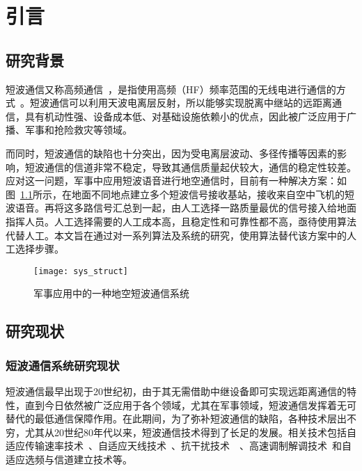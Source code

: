
\chapter{引言}
\label{chapter:introduction}

\section{研究背景}

短波通信又称高频通信~\cite{胡中豫2003现代短波通信}，是指使用高频（HF）频率范围的无线电进行通信的方式~\cite{董彬虹2007短波通信的现状及发展趋势}。短波通信可以利用天波电离层反射，所以能够实现脱离中继站的远距离通信，具有机动性强、设备成本低、对基础设施依赖小的优点，因此被广泛应用于广播、军事和抢险救灾等领域。

而同时，短波通信的缺陷也十分突出，因为受电离层波动、多径传播等因素的影响，短波通信的信道非常不稳定，导致其通信质量起伏较大，通信的稳定性较差。应对这一问题，军事中应用短波语音进行地空通信时，目前有一种解决方案：如图~\ref{fig:sys_struct}所示，在地面不同地点建立多个短波信号接收基站，接收来自空中飞机的短波语音。再将这多路信号汇总到一起，由人工选择一路质量最优的信号接入给地面指挥人员。人工选择需要的人工成本高，且稳定性和可靠性都不高，亟待使用算法代替人工。本文旨在通过对一系列算法及系统的研究，使用算法替代该方案中的人工选择步骤。

\begin{figure}
\centering
\texttt{[image: sys\_struct]}
\caption{军事应用中的一种地空短波通信系统\label{fig:sys_struct}}
\end{figure}

\section{研究现状}

\subsection{短波通信系统研究现状}

短波通信最早出现于20世纪初，由于其无需借助中继设备即可实现远距离通信的特性，直到今日依然被广泛应用于各个领域，尤其在军事领域，短波通信发挥着无可替代的最低通信保障作用。在此期间，为了弥补短波通信的缺陷，各种技术层出不穷，尤其从20世纪80年代以来，短波通信技术得到了长足的发展。相关技术包括自适应传输速率技术~\cite{clarke2003multilevel}、自适应天线技术~\cite{cook2012adaptive}、抗干扰技术~\cite{andersson1995performance}~\cite{zander1995adaptive}、高速调制解调技术~\cite{nilsson1997wideband}和自适应选频与信道建立技术等。

